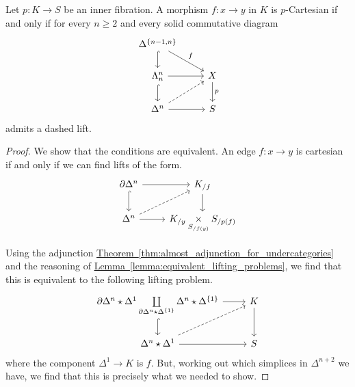 \documentclass[main.tex]{subfiles}
\begin{document}
\begin{proposition}
  Let $p\colon K \to S$ be an inner fibration. A morphism $f\colon x \to y$ in $K$ is $p$-Cartesian if and only if for every $n \geq 2$ and every solid commutative diagram
  \begin{equation*}
    \begin{tikzcd}
      \Delta^{\{n-1, n\}}
      \arrow[d, hook]
      \arrow[dr, "f"]
      \\
      \Lambda_{n}^{n}
      \arrow[r]
      \arrow[d, hook]
      & X
      \arrow[d, "p"]
      \\
      \Delta^{n}
      \arrow[r]
      \arrow[ur, dashed]
      & S
    \end{tikzcd}
  \end{equation*}
  admits a dashed lift.
\end{proposition}
\begin{proof}
  We show that the conditions are equivalent. An edge $f\colon x \to y$ is cartesian if and only if we can find lifts of the form.
  \begin{equation*}
    \begin{tikzcd}
      \partial \Delta^{n}
      \arrow[r]
      \arrow[d, hook]
      & K_{/f}
      \arrow[d]
      \\
      \Delta^{n}
      \arrow[ur, dashed]
      \arrow[r]
      & K_{/y} \underset{S_{/f(y)}}{\times} S_{/p(f)}
    \end{tikzcd}
  \end{equation*}

  Using the adjunction \hyperref[thm:almost_adjunction_for_undercategories]{Theorem~\ref*{thm:almost_adjunction_for_undercategories}} and the reasoning of \hyperref[lemma:equivalent_lifting_problems]{Lemma~\ref*{lemma:equivalent_lifting_problems}}, we find that this is equivalent to the following lifting problem.
  \begin{equation*}
    \begin{tikzcd}
      \partial \Delta^{n} \star \Delta^{1} \coprod\limits_{\partial \Delta^{n} \star \Delta^{\{1\}}} \Delta^{n} \star \Delta^{\{1\}}
      \arrow[r]
      \arrow[d, hook]
      & K
      \arrow[d]
      \\
      \Delta^{n} \star \Delta^{1}
      \arrow[r]
      \arrow[ur, dashed]
      & S
    \end{tikzcd}
  \end{equation*}
  where the component $\Delta^{1} \to K$ is $f$. But, working out which simplices in $\Delta^{n+2}$ we have, we find that this is precisely what we needed to show.
\end{proof}
\end{document}
